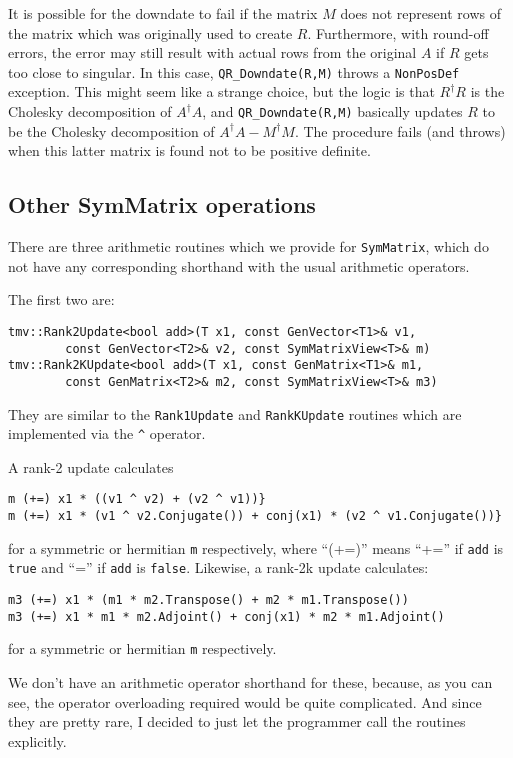 \documentclass[twoside,letterpaper,11pt]{article}
\renewcommand{\tt}[1]{{\texttt {#1}}}
\begin{document}
It is possible for the downdate to fail if the matrix $M$ does not represent rows
of the matrix which was originally used to create $R$.
Furthermore,
with round-off errors, the error may still result with actual rows from the 
original $A$
if $R$ gets too close to singular.  In this case, \tt{QR\_Downdate(R,M)} throws
a \tt{NonPosDef} exception.  This might seem like a strange choice, but the 
logic is that $R^\dagger R$ is the Cholesky decomposition of $A^\dagger A$,
and \tt{QR\_Downdate(R,M)} basically updates $R$ to be the Cholesky decomposition
of $A^\dagger A - M^\dagger M$.  The procedure fails (and throws) when this latter 
matrix is found not to be positive definite.

\subsection{Other SymMatrix operations}

There are three arithmetic routines which we provide for \tt{SymMatrix},
which do not have
any corresponding shorthand with the usual arithmetic operators.

The first two are:
\begin{verbatim}
tmv::Rank2Update<bool add>(T x1, const GenVector<T1>& v1, 
        const GenVector<T2>& v2, const SymMatrixView<T>& m)
tmv::Rank2KUpdate<bool add>(T x1, const GenMatrix<T1>& m1, 
        const GenMatrix<T2>& m2, const SymMatrixView<T>& m3)
\end{verbatim}
They are similar to the \tt{Rank1Update} and \tt{RankKUpdate} routines
which are implemented via the \texttt{\^} operator.

A rank-2 update calculates
\begin{verbatim}
m (+=) x1 * ((v1 ^ v2) + (v2 ^ v1))} 
m (+=) x1 * (v1 ^ v2.Conjugate()) + conj(x1) * (v2 ^ v1.Conjugate())}
\end{verbatim}
for a symmetric or hermitian \tt{m} respectively,
where ``(+=)'' means ``+='' if \tt{add} is \tt{true} and ``='' 
if \tt{add} is \tt{false}.
Likewise, a rank-2k update calculates:
\begin{verbatim}
m3 (+=) x1 * (m1 * m2.Transpose() + m2 * m1.Transpose())
m3 (+=) x1 * m1 * m2.Adjoint() + conj(x1) * m2 * m1.Adjoint()
\end{verbatim}
for a symmetric or hermitian \tt{m} respectively.

We don't have an arithmetic operator 
shorthand for these, because, as you can see, the operator
overloading required would be quite complicated.  
And since they are pretty rare, I decided to just let the programmer 
call the routines explicitly.
\end{document}
